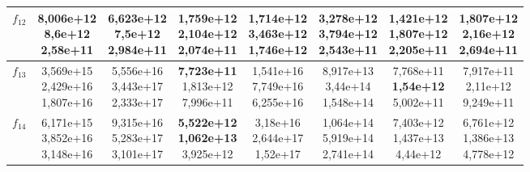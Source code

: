 \begin{table}[t]
\begin{small}
\begin{tabular}{|c|c|c|c|c|c|c|c|}
        $f_{12}$ & \makecell{8,006e+12 \\ 8,6e+12 \\ 2,58e+11}    & \makecell{6,623e+12 \\ 7,5e+12 \\ 2,984e+11}   & \makecell{1,759e+12 \\ 2,104e+12 \\ 2,074e+11} & \makecell{1,714e+12 \\ 3,463e+12 \\ 1,746e+12} & \makecell{3,278e+12 \\ 3,794e+12 \\ 2,543e+11} & \makecell{\textbf{1,421e+12} \\ \textbf{1,807e+12} \\ 2,205e+11} & \makecell{1,807e+12 \\ 2,16e+12 \\ 2,694e+11} \\\hline
        $f_{13}$ & \makecell{3,569e+15 \\ 2,429e+16 \\ 1,807e+16} & \makecell{5,556e+16 \\ 3,443e+17 \\ 2,333e+17} & \makecell{\textbf{7,723e+11} \\ 1,813e+12 \\ 7,996e+11} & \makecell{1,541e+16 \\ 7,749e+16 \\ 6,255e+16} & \makecell{8,917e+13 \\ 3,44e+14 \\ 1,548e+14}  & \makecell{7,768e+11 \\ \textbf{1,54e+12} \\ 5,002e+11} & \makecell{7,917e+11 \\ 2,11e+12 \\ 9,249e+11} \\\hline
        $f_{14}$ & \makecell{6,171e+15 \\ 3,852e+16 \\ 3,148e+16} & \makecell{9,315e+16 \\ 5,283e+17 \\ 3,101e+17} & \makecell{\textbf{5,522e+12} \\ \textbf{1,062e+13} \\ 3,925e+12} & \makecell{3,18e+16 \\ 2,644e+17 \\ 1,52e+17}  & \makecell{1,064e+14 \\ 5,919e+14 \\ 2,741e+14} & \makecell{7,403e+12 \\ 1,437e+13 \\ 4,44e+12} & \makecell{6,761e+12 \\ 1,386e+13 \\ 4,778e+12} \\\hline

\end{tabular}
\end{small}
\end{table}
